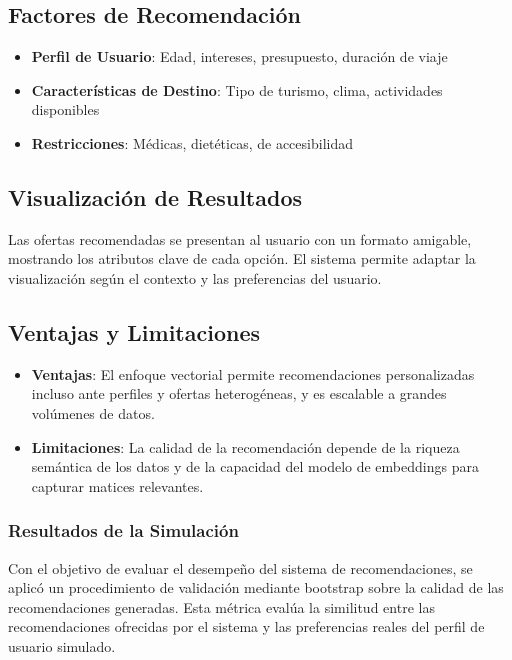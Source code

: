 \documentclass[runningheads]{llncs}
\begin{document}
\subsection{Factores de Recomendación}

\begin{itemize}
\item \textbf{Perfil de Usuario}: Edad, intereses, presupuesto, duración de viaje
\item \textbf{Características de Destino}: Tipo de turismo, clima, actividades disponibles
\item \textbf{Restricciones}: Médicas, dietéticas, de accesibilidad
\end{itemize}

\subsection{Visualización de Resultados}

Las ofertas recomendadas se presentan al usuario con un formato amigable, mostrando los atributos clave de cada opción. El sistema permite adaptar la visualización según el contexto y las preferencias del usuario.

\subsection{Ventajas y Limitaciones}


\begin{itemize}
    \item \textbf{Ventajas}: El enfoque vectorial permite recomendaciones personalizadas incluso ante perfiles y ofertas heterogéneas, y es escalable a grandes volúmenes de datos.
    \item \textbf{Limitaciones}: La calidad de la recomendación depende de la riqueza semántica de los datos y de la capacidad del modelo de embeddings para capturar matices relevantes.
\end{itemize}

\subsubsection{Resultados de la Simulación}

Con el objetivo de evaluar el desempeño del sistema de recomendaciones, se aplicó un procedimiento de validación mediante bootstrap sobre la calidad de las recomendaciones generadas. Esta métrica evalúa la similitud entre las recomendaciones ofrecidas por el sistema y las preferencias reales del perfil de usuario simulado.
\end{document}
